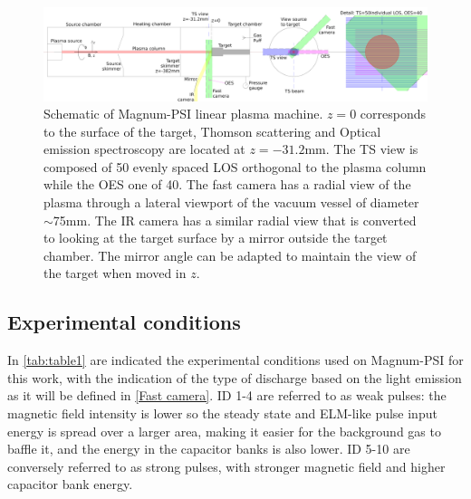 \begin{figure}[!ht]
	\centering
	\includegraphics[width=\linewidth,trim={30 0 0 0},clip]{Chapters/chapter3/figs/layout_5.png}
	\caption{Schematic of Magnum-PSI linear plasma machine. $z=0$ corresponds to the surface of the target, Thomson scattering and Optical emission spectroscopy are located at $z=-31.2$mm. The TS view is composed of 50 evenly spaced LOS orthogonal to the plasma column while the OES one of 40. The fast camera has a radial view of the plasma through a lateral viewport of the vacuum vessel of diameter $\sim$75mm. The IR camera has a similar radial view that is converted to looking at the target surface by a mirror outside the target chamber. The mirror angle can be adapted to maintain the view of the target when moved in $z$.}
	\label{fig:layout}
\end{figure}


\subsection{Experimental conditions}\label{Experimental conditions}

In \autoref{tab:table1} are indicated the experimental conditions used on Magnum-PSI for this work, with the indication of the type of discharge based on the light emission as it will be defined in \autoref{Fast camera}. ID 1-4 are referred to as weak pulses: the magnetic field intensity is lower so the steady state and ELM-like pulse input energy is spread over a larger area, making it easier for the background gas to baffle it, and the energy in the capacitor banks is also lower. ID 5-10 are conversely referred to as strong pulses, with stronger magnetic field and higher capacitor bank energy.



